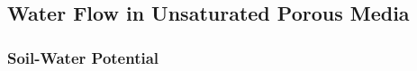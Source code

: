 \subsection{Water Flow in Unsaturated Porous Media}\label{sec:richards}


\subsubsection{Soil-Water Potential}


